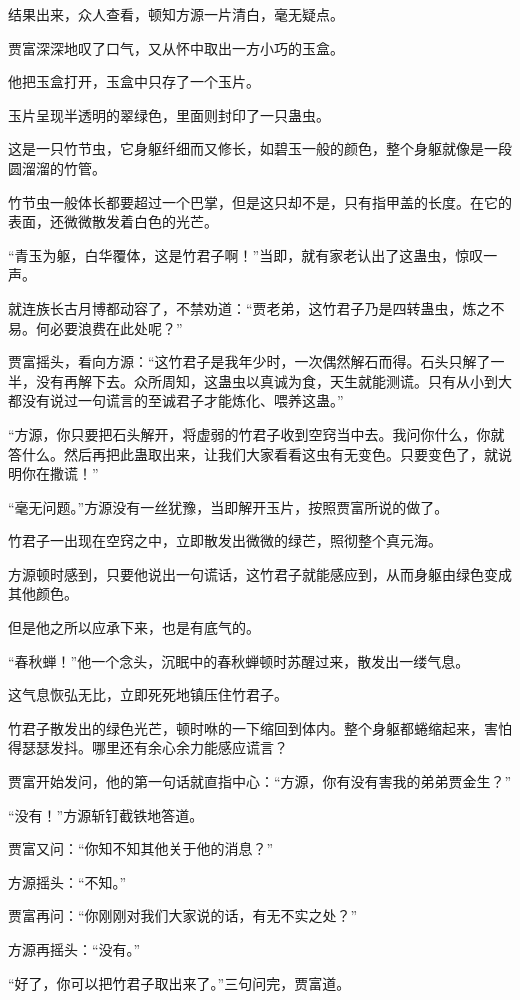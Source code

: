 \begin{this_body}
结果出来，众人查看，顿知方源一片清白，毫无疑点。

贾富深深地叹了口气，又从怀中取出一方小巧的玉盒。

他把玉盒打开，玉盒中只存了一个玉片。

玉片呈现半透明的翠绿色，里面则封印了一只蛊虫。

这是一只竹节虫，它身躯纤细而又修长，如碧玉一般的颜色，整个身躯就像是一段圆溜溜的竹管。

竹节虫一般体长都要超过一个巴掌，但是这只却不是，只有指甲盖的长度。在它的表面，还微微散发着白色的光芒。

“青玉为躯，白华覆体，这是竹君子啊！”当即，就有家老认出了这蛊虫，惊叹一声。

就连族长古月博都动容了，不禁劝道：“贾老弟，这竹君子乃是四转蛊虫，炼之不易。何必要浪费在此处呢？”

贾富摇头，看向方源：“这竹君子是我年少时，一次偶然解石而得。石头只解了一半，没有再解下去。众所周知，这蛊虫以真诚为食，天生就能测谎。只有从小到大都没有说过一句谎言的至诚君子才能炼化、喂养这蛊。”

“方源，你只要把石头解开，将虚弱的竹君子收到空窍当中去。我问你什么，你就答什么。然后再把此蛊取出来，让我们大家看看这虫有无变色。只要变色了，就说明你在撒谎！”

“毫无问题。”方源没有一丝犹豫，当即解开玉片，按照贾富所说的做了。

竹君子一出现在空窍之中，立即散发出微微的绿芒，照彻整个真元海。

方源顿时感到，只要他说出一句谎话，这竹君子就能感应到，从而身躯由绿色变成其他颜色。

但是他之所以应承下来，也是有底气的。

“春秋蝉！”他一个念头，沉眠中的春秋蝉顿时苏醒过来，散发出一缕气息。

这气息恢弘无比，立即死死地镇压住竹君子。

竹君子散发出的绿色光芒，顿时咻的一下缩回到体内。整个身躯都蜷缩起来，害怕得瑟瑟发抖。哪里还有余心余力能感应谎言？

贾富开始发问，他的第一句话就直指中心：“方源，你有没有害我的弟弟贾金生？”

“没有！”方源斩钉截铁地答道。

贾富又问：“你知不知其他关于他的消息？”

方源摇头：“不知。”

贾富再问：“你刚刚对我们大家说的话，有无不实之处？”

方源再摇头：“没有。”

“好了，你可以把竹君子取出来了。”三句问完，贾富道。


\end{this_body}
